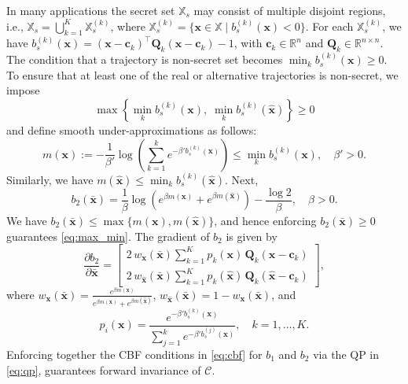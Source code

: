 \documentclass[letterpaper, 10 pt, conference]{ieeeconf}  %
\begin{document}
In many applications the secret set $\mathbb{X}_s$ may consist of multiple disjoint regions, i.e., $\mathbb{X}_s = \bigcup_{k=1}^K \mathbb{X}_s^{(k)}$, where $\mathbb{X}_s^{(k)} = \big\{ \mathbf{x} \in \mathbb{X} \mid b_s^{(k)}(\mathbf{x}) < 0 \big\}$. For each $\mathbb{X}_s^{(k)}$, we have $b_s^{(k)}(\mathbf{x}) = (\mathbf{x} - \mathbf{c}_k)^\top \mathbf{Q}_k (\mathbf{x} - \mathbf{c}_k) - 1$, with $\mathbf{c}_k \in \mathbb{R}^n$ and $\mathbf{Q}_k \in \mathbb{R}^{n \times n}$. The condition that a trajectory is non-secret set becomes $\min_k b_s^{(k)}(\mathbf{x}) \ge 0$. To ensure that at least one of the real or alternative trajectories is non-secret, we impose 
\begin{equation} \label{eq:max_min}
    \max\!\left\{ \min_{k} b_s^{(k)}(\mathbf{x}),\; \min_{k} b_s^{(k)}(\hat{\mathbf{x}}) \right\} \ge 0
\end{equation}
and define smooth under-approximations as follows:
\begin{equation*}
    m(\mathbf{x}) := -\frac{1}{\beta'} \log\!\left( \sum_{k=1}^k e^{-\beta' b_s^{(k)}(\mathbf{x})} \right) \le \min_{k} b_s^{(k)}(\mathbf{x}), \quad \beta' > 0.
\end{equation*}
Similarly, we have $m(\hat{\mathbf{x}}) \le \min_{k} b_s^{(k)}(\hat{\mathbf{x}})$. Next, 
\begin{equation} \label{eq:cbf_multiple_secret}
    b_2(\bar{\mathbf{x}}) = \frac{1}{\beta}
    \log\!\left(
    e^{\beta m(\mathbf{x})} + e^{\beta m(\hat{\mathbf{x}})}
    \right)
    - \frac{\log 2}{\beta}, \quad \beta > 0.
\end{equation}
We have $b_2(\bar{\mathbf{x}}) \le \max\{m(\mathbf{x}), m(\hat{\mathbf{x}})\}$, and hence enforcing $b_2(\bar{\mathbf{x}}) \ge 0$ guarantees \eqref{eq:max_min}. The gradient of $b_2$ is given by
\begin{equation*}
    \frac{\partial b_2}{\partial \bar{\mathbf{x}}} =
    \begin{bmatrix} 2 \,w_\mathbf{x}(\bar{\mathbf{x}}) \sum_{k=1}^K p_k(\mathbf{x})\, \mathbf{Q}_k (\mathbf{x} - \mathbf{c}_k) \\[2.5mm] 2 \, w_{\hat{\mathbf{x}}}(\bar{\mathbf{x}}) \sum_{k=1}^K p_k(\hat{\mathbf{x}})\, \mathbf{Q}_k (\hat{\mathbf{x}} - \mathbf{c}_k) \end{bmatrix},
\end{equation*}
where $w_\mathbf{x}(\bar{\mathbf{x}}) = \frac{e^{\beta m(\mathbf{x})}}{e^{\beta m(\mathbf{x})} + e^{\beta m(\hat{\mathbf{x}})}}$, $w_{\hat{\mathbf{x}}}(\bar{\mathbf{x}}) = 1 - w_\mathbf{x}(\bar{\mathbf{x}})$, and
\begin{equation*}
    p_i(\mathbf{x}) =
    \frac{e^{-\beta' b_s^{(k)}(\mathbf{x})}}{\sum_{j=1}^k e^{-\beta' b_s^{(j)}(\mathbf{x})}}, \quad k = 1, \dots, K.
\end{equation*}
Enforcing together the CBF conditions in \eqref{eq:cbf} for $b_1$ and $b_2$ via the QP in \eqref{eq:qp}, guarantees forward invariance of $\mathcal{C}$.
\end{document}
